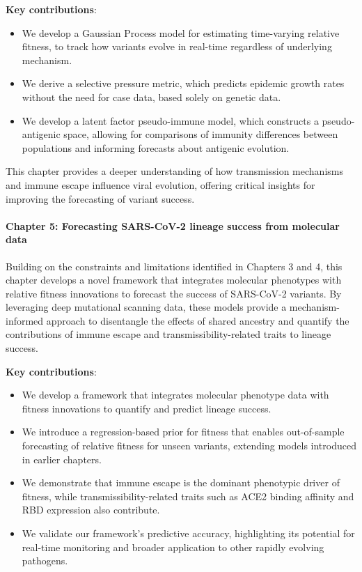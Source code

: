 \noindent\textbf{Key contributions}:
\begin{itemize}
  \item We develop a Gaussian Process model for estimating time-varying relative fitness, to track how variants evolve in real-time regardless of underlying mechanism.
  \item We derive a selective pressure metric, which predicts epidemic growth rates without the need for case data, based solely on genetic data.
  \item We develop a latent factor pseudo-immune model, which constructs a pseudo-antigenic space, allowing for comparisons of immunity differences between populations and informing forecasts about antigenic evolution.
\end{itemize}

This chapter provides a deeper understanding of how transmission mechanisms and immune escape influence viral evolution, offering critical insights for improving the forecasting of variant success.

\paragraph{Chapter 5: Forecasting SARS-CoV-2 lineage success from molecular data}

Building on the constraints and limitations identified in Chapters 3 and 4, this chapter develops a novel framework that integrates molecular phenotypes with relative fitness innovations to forecast the success of SARS-CoV-2 variants.
By leveraging deep mutational scanning data, these models provide a mechanism-informed approach to disentangle the effects of shared ancestry and quantify the contributions of immune escape and transmissibility-related traits to lineage success.

\noindent\textbf{Key contributions}:
\begin{itemize}
  \item  We develop a framework that integrates molecular phenotype data with fitness innovations to quantify and predict lineage success.
  \item We introduce a regression-based prior for fitness that enables out-of-sample forecasting of relative fitness for unseen variants, extending models introduced in earlier chapters.
  \item We demonstrate that immune escape is the dominant phenotypic driver of fitness, while transmissibility-related traits such as ACE2 binding affinity and RBD expression also contribute.
  \item We validate our framework’s predictive accuracy, highlighting its potential for real-time monitoring and broader application to other rapidly evolving pathogens.
\end{itemize}

